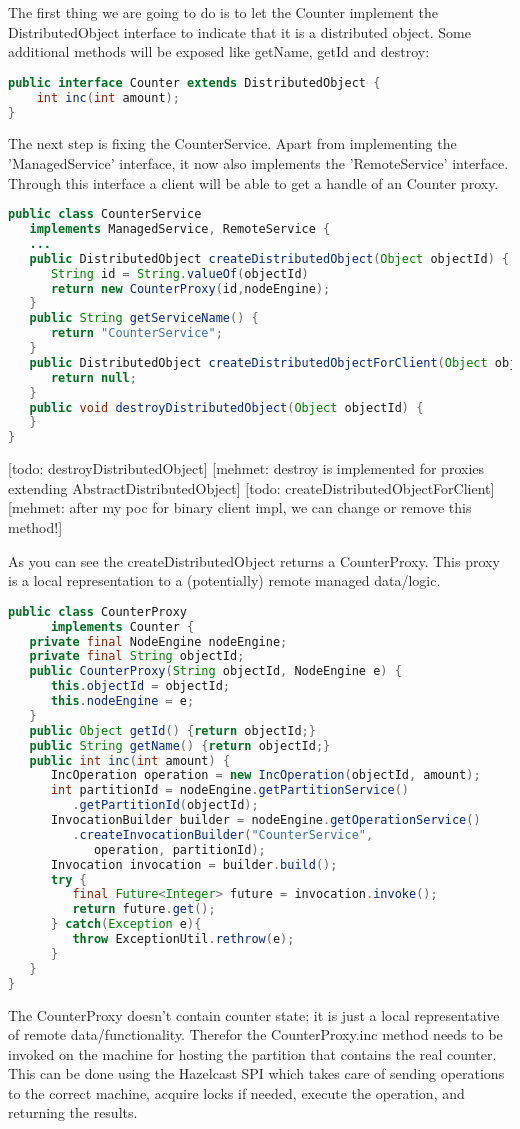The first thing we are going to do is to let the Counter implement the DistributedObject interface to indicate that it is a distributed object. Some additional methods will be exposed like getName, getId and destroy:
\begin{lstlisting}[language=java]
public interface Counter extends DistributedObject {
    int inc(int amount);
}
\end{lstlisting}

The next step is fixing the CounterService. Apart from implementing the 'ManagedService' interface, it now also implements the 'RemoteService' interface. Through this interface a client will be able to get a handle of an Counter proxy. 
\begin{lstlisting}[language=java]
public class CounterService 
   implements ManagedService, RemoteService {
   ...  
   public DistributedObject createDistributedObject(Object objectId) {
      String id = String.valueOf(objectId)
      return new CounterProxy(id,nodeEngine);
   }
   public String getServiceName() {
      return "CounterService";
   }
   public DistributedObject createDistributedObjectForClient(Object objectId) {
      return null;
   }
   public void destroyDistributedObject(Object objectId) {
   }
}
\end{lstlisting}
[todo: destroyDistributedObject] [mehmet: destroy is implemented for proxies extending AbstractDistributedObject]
[todo: createDistributedObjectForClient] [mehmet: after my poc for binary client impl, we can change or remove this method!]

As you can see the createDistributedObject returns a CounterProxy. This proxy is a local representation to a (potentially) remote managed data/logic.  
\begin{lstlisting}[language=java]
public class CounterProxy 
      implements Counter {
   private final NodeEngine nodeEngine;
   private final String objectId;
   public CounterProxy(String objectId, NodeEngine e) {
      this.objectId = objectId;      
      this.nodeEngine = e;  
   }
   public Object getId() {return objectId;}
   public String getName() {return objectId;}
   public int inc(int amount) {
      IncOperation operation = new IncOperation(objectId, amount);   
      int partitionId = nodeEngine.getPartitionService()
         .getPartitionId(objectId);
      InvocationBuilder builder = nodeEngine.getOperationService()
         .createInvocationBuilder("CounterService", 
            operation, partitionId);
      Invocation invocation = builder.build();
      try {
         final Future<Integer> future = invocation.invoke();
         return future.get();
      } catch(Exception e){
         throw ExceptionUtil.rethrow(e);
      }
   }
}
\end{lstlisting}
The CounterProxy doesn't contain counter state; it is just a local representative of remote data/functionality. Therefor the CounterProxy.inc method needs to be invoked on the machine for hosting the partition that contains the real counter. This can be done using the Hazelcast SPI which takes care of sending operations to the correct machine, acquire locks if needed, execute the operation, and returning the results.

